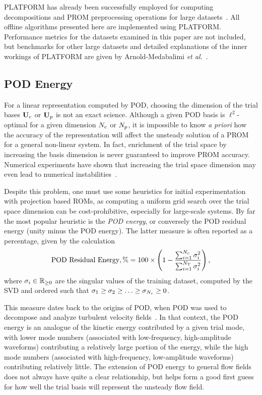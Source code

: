 PLATFORM has already been successfully employed for computing decompositions and PROM preprocessing operations for large datasets~\cite{Wentland2021,ArnoldMedabalimi2020,Harvazinski2020,Pan2021,ArnoldMedabalimi2022}. All offline algorithms presented here are implemented using PLATFORM. Performance metrics for the datasets examined in this paper are not included, but benchmarks for other large datasets and detailed explanations of the inner workings of PLATFORM are given by Arnold-Medabalimi \textit{et al.}~\cite{PLATFORM}.

\subsection{POD Energy}
%
For a linear representation computed by POD, choosing the dimension of the trial bases $\consTrial$ or $\primTrial$ is not an exact science. Although a given POD basis is $\ell^2$-optimal for a given dimension $N_c$ or $N_p$, it is impossible to know \textit{a priori} how the accuracy of the representation will affect the unsteady solution of a PROM for a general non-linear system. In fact, enrichment of the trial space by increasing the basis dimension is never guaranteed to improve PROM accuracy. Numerical experiments have shown that increasing the trial space dimension may even lead to numerical instabilities~\cite{Huang2022}.

Despite this problem, one must use some heuristics for initial experimentation with projection based ROMs, as computing a uniform grid search over the trial space dimension can be cost-prohibitive, especially for large-scale systems. By far the most popular heuristic is the \textit{POD energy}, or conversely the POD residual energy (unity minus the POD energy). The latter measure is often reported as a percentage, given by the calculation
%
\begin{equation}\label{eq:podEnergyResidual}
    \text{POD Residual Energy}, \% = 100 \times \left( 1 - \frac{\sum_{i=1}^{N_c} \sigma_{i}^2}{\sum_{i=1}^{N_{\text{T}}} \sigma_{i}^2} \right),
\end{equation}
%
where $\sigma_{i} \in \mathbb{R}_{\ge 0}$ are the singular values of the training dataset, computed by the SVD and ordered such that $\sigma_1 \ge \sigma_2 \ge \hdots \ge \sigma_{N_c} \ge 0$.

This measure dates back to the origins of POD, when POD was used to decompose and analyze turbulent velocity fields~\cite{berkoozPOD}. In that context, the POD energy is an analogue of the kinetic energy contributed by a given trial mode, with lower mode numbers (associated with low-frequency, high-amplitude waveforms) contributing a relatively large portion of the energy, while the high mode numbers (associated with high-frequency, low-amplitude waveforms) contributing relatively little. The extension of POD energy to general flow fields does not always have quite a clear relationship, but helps form a good first guess for how well the trial basis will represent the unsteady flow field.

